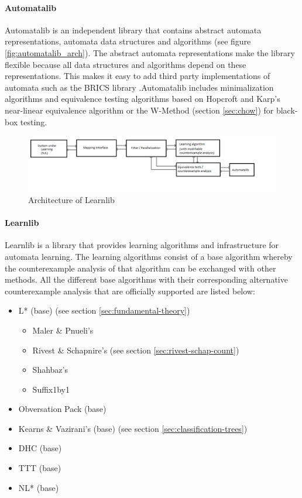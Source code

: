 \documentclass[multi,crop=false,class=article]{standalone}
\begin{document}
\paragraph{Automatalib} Automatalib is an independent library that contains 
abstract automata representations, automata data structures and algorithms (see 
figure \ref{fig:automatalib_arch}). The 
abstract automata representations make the library flexible because all data 
structures and algorithms depend on these representations. This makes it easy 
to add third party implementations of automata such as the BRICS library 
\cite{Alur2005}.Automatalib includes minimalization algorithms and equivalence 
testing algorithms based on Hopcroft and Karp's near-linear equivalence 
algorithm \cite{Hopcroft1971} or the W-Method (section \ref{sec:chow}) for 
black-box testing.

\begin{figure}[!ht]
	\includegraphics[width=\textwidth]{Tool_images/learnlib_architecture.png}
	\caption{Architecture of Learnlib}
	\label{fig:learnlib_arch}
\end{figure}

\paragraph{Learnlib} Learnlib is a library that provides learning algorithms and
infrastructure for automata learning. The learning algorithms consist of a base 
algorithm whereby the counterexample analysis of that algorithm can be 
exchanged with other methods. All the different base algorithms with their 
corresponding alternative counterexample analysis that are officially supported 
are listed below:

\begin{itemize}
	\item L* (base) (see section \ref{sec:fundamental-theory})
	\begin{itemize}
		\item Maler \& Pnueli's \cite{Maler1995}
		\item Rivest \& Schapnire's (see section \ref{sec:rivest-schap-count})
		\item Shahbaz's \cite{Shahbaz2009}
		\item Suffix1by1 \cite{Irfan2010}
	\end{itemize}
	\item Obversation Pack (base) \cite{Howar2012a}
	\item Kearns \& Vazirani's (base) (see section 
	\ref{sec:classification-trees})
	\item DHC (base) \cite{Merten2012}
	\item TTT (base) 
	\item NL* (base) \cite{Bollig2009}
\end{itemize}
\end{document}
